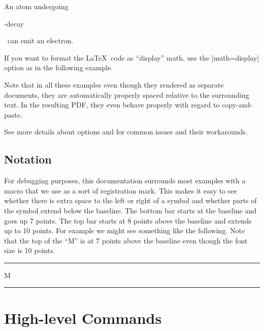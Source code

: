\documentclass[10pt]{ltxdoc}
\def\gauge{%
  \rule{0.2em}{7pt}%
  \llap{\rule[8pt]{0.2em}{2pt}}%
}
\begin{document}
\begin{tcblisting}{}
An atom undergoing
\begin{externalenv}[preamble={\usepackage{textgreek}}]
\textbeta-decay
\end{externalenv}
~can emit an electron.
\end{tcblisting}

If you want to format the \LaTeX\ code as ``display'' math, use the
|math=display| option as in the following example.

\begin{tcblisting}{}
\end{tcblisting}

Note that in all these examples even though they rendered as separate
documents, they are automatically properly spaced relative to the
surrounding text.
In the resulting PDF, they even behave properly with regard to
copy-and-paste.

See  more details about options and  for common issues and their workarounds.

\subsection{Notation}
\label{subsec:Notation}

For debugging purposes, this documentation surrounds most examples with
a  macro that we use as a sort of registration mark.
This makes it easy to see whether there is extra space to the left or
right of a symbol and whether parts of the symbol extend below the
baseline.
The bottom bar starts at the baseline and goes up 7 points.
The top bar starts at 8 points above the baseline and extends up to 10
points.
For example we might see something like the following.
Note that the top of the ``M'' is at 7 points above the baseline
even though the font size is 10 points.

\begin{tcblisting}{}
\gauge M\gauge
\end{tcblisting}

\section{High-level Commands}
\label{sec:High-level Commands}
\end{document}
